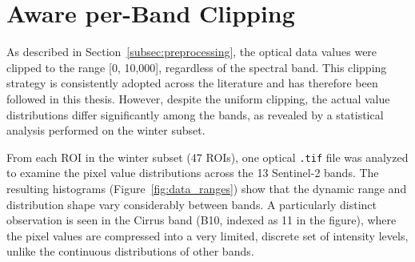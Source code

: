 \section{Aware per-Band Clipping}

As described in Section~\ref{subsec:preprocessing}, the optical data values were clipped to the range [0, 10,000], regardless of the spectral band. This clipping strategy is consistently adopted across the literature and has therefore been followed in this thesis. However, despite the uniform clipping, the actual value distributions differ significantly among the bands, as revealed by a statistical analysis performed on the winter subset.

From each ROI in the winter subset (47 ROIs), one optical \texttt{.tif} file was analyzed to examine the pixel value distributions across the 13 Sentinel-2 bands. The resulting histograms (Figure~\ref{fig:data_ranges}) show that the dynamic range and distribution shape vary considerably between bands. A particularly distinct observation is seen in the Cirrus band (B10, indexed as 11 in the figure), where the pixel values are compressed into a very limited, discrete set of intensity levels, unlike the continuous distributions of other bands.


